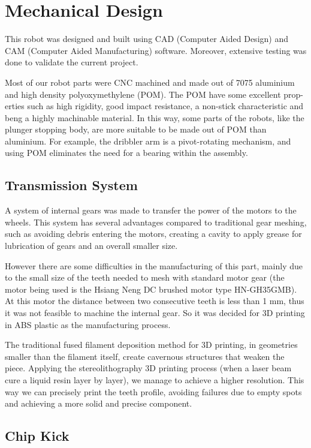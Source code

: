 \section{Mechanical Design}\label{mec_sec}

This robot was designed and built using CAD (Computer Aided Design) and CAM
(Computer Aided Manufacturing) software. Moreover, extensive testing was done
to validate the current project.

Most of our robot parts were CNC machined and made out of 7075 aluminium and
high density polyoxymethylene (POM). The POM have some excellent prop- erties
such as high rigidity, good impact resistance, a non-stick characteristic and
beng a highly machinable material. In this way, some parts of the robots, like
the plunger stopping body, are more suitable to be made out of POM than
aluminium. For example, the dribbler arm is a pivot-rotating mechanism, and
using POM eliminates the need for a bearing within the assembly.

\subsection{Transmission System}

A system of internal gears was made to transfer the power of the motors to the
wheels. This system has several advantages compared to traditional gear
meshing, such as avoiding debris entering the motors, creating a cavity to
apply grease for lubrication of gears and an overall smaller size.

However there are some difficulties in the manufacturing of this part, mainly
due to the small size of the teeth needed to mesh with standard motor gear (the
motor being used is the Hsiang Neng DC brushed motor type HN-GH35GMB). At this
motor the distance between two consecutive teeth is less than 1 mm, thus it was
not feasible to machine the internal gear. So it was decided for 3D printing in
ABS plastic as the manufacturing process.

The traditional fused filament deposition method for 3D printing, in geometries
smaller than the filament itself, create cavernous structures that weaken the
piece. Applying the stereolithography 3D printing process (when a laser beam
cure a liquid resin layer by layer), we manage to achieve a higher resolution.
This way we can precisely print the teeth profile, avoiding failures due to
empty spots and achieving a more solid and precise component.

\subsection{Chip Kick}

